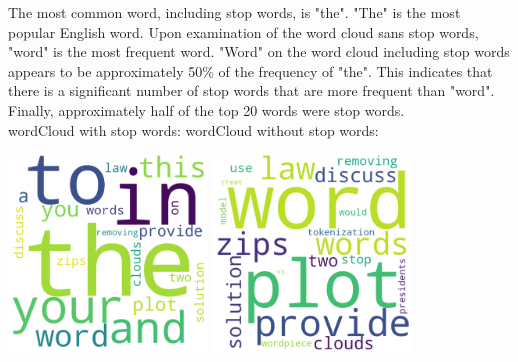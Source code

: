 \documentclass{article}
\begin{document}
The most common word, including stop words, is "the". "The" is the most popular English word. Upon examination of the word cloud sans stop words, "word" is the most frequent word. "Word" on the word cloud including stop words appears to be approximately 50\% of the frequency of "the". This indicates that there is a significant number of stop words that are more frequent than "word". Finally, approximately half of the top 20 words were stop words. \\

wordCloud with stop words: \hspace*{1.6in} wordCloud without stop words:

\includegraphics[width=200]{images/wordCloud.png}
\hspace*{0.5in}
\includegraphics[width=200]{images/wordCloudNoStopWords.png}
\end{document}
